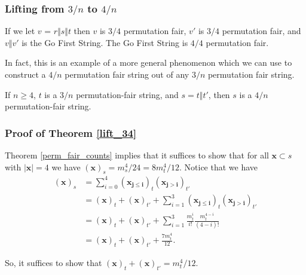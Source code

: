 \documentclass[aspectratio=169]{beamer}
\begin{document}
\begin{frame}[triangle=siiblue]
\frametitle{Lifting from $3/n$ to $4/n$}
If we let $v$ = $r \Vert s \Vert t$ then $v$ is $3/4$ permutation fair, $v'$ is $3/4$ permutation fair, and $v \Vert v'$ is the Go First String. The Go First String is $4/4$ permutation fair.

\vfill

In fact, this is an example of a more general phenomenon which we can use to construct a $4/n$ permutation fair string out of any $3/n$ permutation fair string.

\vfill

\begin{siitheorem}[label=lift_34]{}{}
If $n \geq 4$, $t$ is a $3/n$ permutation-fair string, and $s = t \Vert t'$, then $s$ is a $4/n$ permutation-fair string.
\end{siitheorem}
\end{frame}

\begin{frame}[triangle=siiblue]
\frametitle{Proof of Theorem \ref{lift_34}}
Theorem \ref{perm_fair_counts} implies that it suffices to show that for all $\mathbf{x} \subset s$ with $|\mathbf{x}| = 4$ we have $(\mathbf{x})_s = m_s^4 / 24 = 8m_t^4 / 12$. Notice that we have
\begin{equation*}
\begin{split}
(\mathbf{x})_s &= \sum_{i=0}^4 (\mathbf{x_{j \leq i}})_t(\mathbf{x_{j > i}})_{t'} \\
&= (\mathbf{x})_t + (\mathbf{x})_{t'} + \sum_{i=1}^3 (\mathbf{x_{j \leq i}})_t(\mathbf{x_{j > i}})_{t'} \\
&= (\mathbf{x})_t + (\mathbf{x})_{t'}  + \sum_{i=1}^3 \frac{m_t^i}{i!}\frac{m_t^{4-i}}{(4-i)!} \\
&= (\mathbf{x})_t + (\mathbf{x})_{t'}  + \frac{7m_t^4}{12}.
\end{split}
\end{equation*}

So, it suffices to show that $(\mathbf{x})_t + (\mathbf{x})_{t'} = m_t^4 / 12$.
\end{frame}
\end{document}
